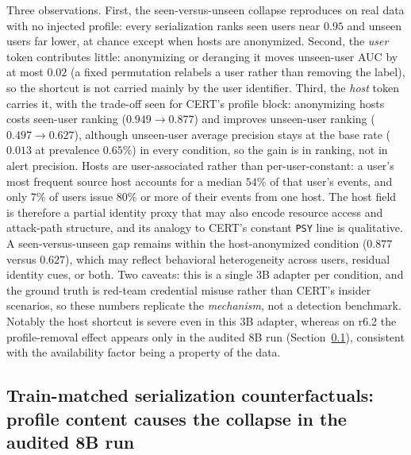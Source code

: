\documentclass[10pt]{article} %
\newcommand{\rsix}{r6.2}
\begin{document}
Three observations. First, the seen-versus-unseen collapse reproduces on real
data with no injected profile: every serialization ranks seen users near
$0.95$ and unseen users far lower, at chance except when hosts are
anonymized. Second, the \emph{user} token contributes little: anonymizing or
deranging it moves unseen-user AUC by at most $0.02$ (a fixed permutation
relabels a user rather than removing the label), so the shortcut is not
carried mainly by the user identifier. Third, the \emph{host} token carries
it, with the trade-off seen for CERT's profile block: anonymizing hosts costs
seen-user ranking ($0.949\!\to\!0.877$) and improves unseen-user ranking
($0.497\!\to\!0.627$), although unseen-user average precision stays at the
base rate ($0.013$ at prevalence $0.65\%$) in every condition, so the gain is
in ranking, not in alert precision. Hosts are user-associated rather than
per-user-constant: a user's most frequent source host accounts for a median
$54\%$ of that user's events, and only $7\%$ of users issue $80\%$ or more of
their events from one host. The host field is therefore a partial identity
proxy that may also encode resource access and attack-path structure, and
its analogy to CERT's constant \texttt{PSY} line is qualitative. A
seen-versus-unseen gap remains within the host-anonymized condition ($0.877$
versus $0.627$), which may reflect behavioral heterogeneity across users,
residual identity cues, or both. Two caveats: this is a single $3$B adapter
per condition, and the ground truth is red-team credential misuse rather than
CERT's insider scenarios, so these numbers replicate the \emph{mechanism}, not
a detection benchmark. Notably the host shortcut is severe even in this $3$B
adapter, whereas on \rsix{} the profile-removal effect appears only in the
audited $8$B run (Section~\ref{sec:trainfactorial}), consistent with the
availability factor being a property of the data.

\subsection{Train-matched serialization counterfactuals: profile content causes the collapse in the audited 8B run}
\label{sec:trainfactorial}
\end{document}
